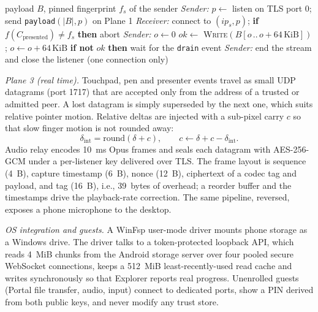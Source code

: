 \documentclass[conference,a4paper]{IEEEtran}
\begin{document}
\begin{algorithm}[t]
\caption{One-shot bulk transfer on Plane 2}
\label{alg:bulk}
\begin{algorithmic}[1]
\small
\REQUIRE payload $B$, pinned fingerprint $f_s$ of the sender
\STATE \textit{Sender:} $p\gets$ listen on TLS port 0; send \texttt{payload}$(|B|,p)$ on Plane 1
\STATE \textit{Receiver:} connect to $(\mathit{ip}_s,p)$; \textbf{if} $f(C_{\mathrm{presented}})\neq f_s$ \textbf{then} abort
\STATE \textit{Sender:} $o\gets0$
  \STATE $\mathit{ok}\gets$ \textsc{Write}$(B[o\,..\,o+64\,\mathrm{KiB}])$; $o\gets o+64\,\mathrm{KiB}$
  \STATE \textbf{if not} $\mathit{ok}$ \textbf{then} wait for the \texttt{drain} event
\ENDWHILE
\STATE \textit{Sender:} end the stream and close the listener (one connection only)
\end{algorithmic}
\end{algorithm}

\textit{Plane 3 (real time).} Touchpad, pen and presenter events travel as small UDP datagrams (port 1717) that are accepted only from the address of a trusted or admitted peer. A lost datagram is simply superseded by the next one, which suits relative pointer motion. Relative deltas are injected with a sub-pixel carry $c$ so that slow finger motion is not rounded away:
\begin{equation}
\delta_{\mathrm{int}}=\mathrm{round}(\delta+c),\qquad c\gets\delta+c-\delta_{\mathrm{int}}.
\end{equation}
Audio relay encodes 10~ms Opus frames \cite{rfc6716} and seals each datagram with AES-256-GCM under a per-listener key delivered over TLS. The frame layout is sequence (4~B), capture timestamp (6~B), nonce (12~B), ciphertext of a codec tag and payload, and tag (16~B), i.e., 39~bytes of overhead; a reorder buffer and the timestamps drive the playback-rate correction. The same pipeline, reversed, exposes a phone microphone to the desktop.

\textit{OS integration and guests.} A WinFsp user-mode driver \cite{winfsp} mounts phone storage as a Windows drive. The driver talks to a token-protected loopback API, which reads 4~MiB chunks from the Android storage server over four pooled secure WebSocket connections, keeps a 512~MiB least-recently-used read cache and writes synchronously so that Explorer reports real progress. Unenrolled guests (Portal file transfer, audio, input) connect to dedicated ports, show a PIN derived from both public keys, and never modify any trust store.
\end{document}
